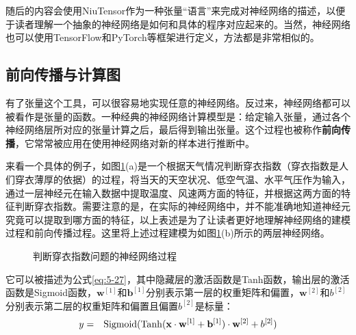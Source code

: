 \parinterval 随后的内容会使用NiuTensor作为一种张量``语言''来完成对神经网络的描述，以便于读者理解一个抽象的神经网络是如何和具体的程序对应起来的。当然，神经网络也可以使用TensorFlow和PyTorch等框架进行定义，方法都是非常相似的。


\subsection{前向传播与计算图}

\parinterval 有了张量这个工具，可以很容易地实现任意的神经网络。反过来，神经网络都可以被看作是张量的函数。一种经典的神经网络计算模型是：给定输入张量，通过各个神经网络层所对应的张量计算之后，最后得到输出张量。这个过程也被称作{\small\sffamily\bfseries{前向传播}}，它常常被应用在使用神经网络对新的样本进行推断中。

\parinterval 来看一个具体的例子，如图\ref{fig:5-37}(a)是一个根据天气情况判断穿衣指数（穿衣指数是人们穿衣薄厚的依据）的过程，将当天的天空状况、低空气温、水平气压作为输入，通过一层神经元在输入数据中提取温度、风速两方面的特征，并根据这两方面的特征判断穿衣指数。需要注意的是，在实际的神经网络中，并不能准确地知道神经元究竟可以提取到哪方面的特征，以上表述是为了让读者更好地理解神经网络的建模过程和前向传播过程。这里将上述过程建模为如图\ref{fig:5-37}(b)所示的两层神经网络。

\begin{figure}[htp]
\centering

\caption{判断穿衣指数问题的神经网络过程}
\label{fig:5-37}
\end{figure}

\parinterval 它可以被描述为公式\ref{eq:5-27}，其中隐藏层的激活函数是Tanh函数，输出层的激活函数是Sigmoid函数，$\mathbf w^{[1]}$和$\mathbf b^{[1]}$分别表示第一层的权重矩阵和偏置，$\mathbf w^{[2]}$和$b^{[2]}$分别表示第二层的权重矩阵和偏置且偏置$b^{[2]}$是标量：
\begin{eqnarray}
y&=&{\rm{Sigmoid}}({\rm{Tanh}}(\mathbf x\cdot \mathbf w^{[1]}+\mathbf b^{[1]})\cdot \mathbf w^{[2]}+ b^{[2]} )
\label{eq:5-27}
\end{eqnarray}


